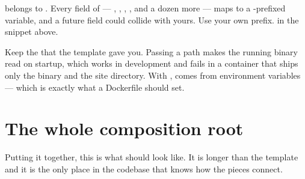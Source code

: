 \begin{pitfall}
 belongs to . Every field of  ---
, , , , and a dozen more ---
maps to a -prefixed variable, and a future field could collide with yours. Use your
own prefix.  in the snippet above.
\end{pitfall}

\begin{pitfall}
Keep the  that the template gave you. Passing a path makes the running binary read
 on startup, which works in development and fails in a container that ships only
the binary and the site directory. With ,  comes from
 environment variables --- which is exactly what a Dockerfile should set.
\end{pitfall}

\section{The whole composition root}

Putting it together, this is what  should look like. It is longer than the template
and it is the only place in the codebase that knows how the pieces connect.

